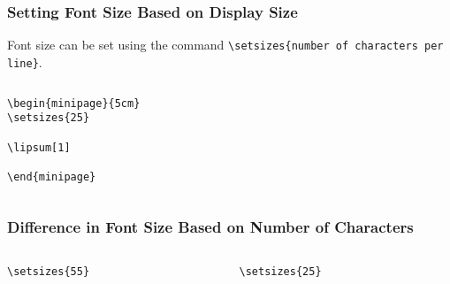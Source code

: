 \begin{frame}[fragile]
  \frametitle{Setting Font Size Based on Display Size}

  Font size can be set using the command \verb|\setsizes{number of characters per line}|.
  
\begin{columns}
  \begin{column}{0.5\textwidth}
\begin{verbatim}
\begin{minipage}{5cm}
\setsizes{25}

\lipsum[1]

\end{minipage}
\end{verbatim}
\end{column}
\begin{column}{0.5\textwidth}

\end{column}
\end{columns}

\end{frame}

\begin{frame}[fragile]
  \frametitle{Difference in Font Size Based on Number of Characters}
\begin{columns}
  \begin{column}{0.5\textwidth}
\begin{verbatim}
\setsizes{55}
\end{verbatim}

\end{column}
\begin{column}{0.5\textwidth}
\begin{verbatim}
\setsizes{25}
\end{verbatim}

\end{column}
\end{columns}
\end{frame}

